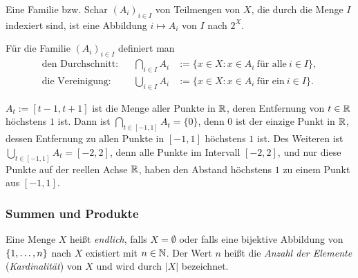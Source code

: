 Eine Familie bzw. Schar  $ (A_i)_{i \in I}$ von Teilmengen von $ X $, die durch die Menge $I$ indexiert sind,  ist eine Abbildung $i \mapsto A_i$ von $I$ nach $2^X$. 

Für die Familie $ (A_i)_{i \in I} $ definiert man
\begin{align*}
	\text{den Durchschnitt:} && \bigcap_{i \in I} A_i &:= \{ x \in X : x \in A_i \:\text{für alle}\: i \in I \},\\
	\text{die Vereinigung:} && \bigcup_{i \in I} A_i &:= \{ x \in X : x \in A_i \:\text{für ein}\: i \in I \}.
\end{align*}

\begin{bsp}
	 $A_t := [t-1,t+1]$ ist die Menge aller Punkte in $\mathbb R$, deren Entfernung von $t \in \mathbb R$ höchstens $1$ ist. Dann ist $\bigcap_{t \in [-1,1]} A_t = \{0\}$, denn $0$ ist der einzige Punkt in $\mathbb R$, dessen Entfernung zu allen Punkte in $[-1,1]$ höchstens $1$ ist. Des Weiteren ist $\bigcup_{t \in [-1,1]} A_t = [-2,2]$, denn alle Punkte im Intervall $[-2,2]$, und nur diese Punkte auf der reellen Achse $\mathbb R$, haben den Abstand höchstens $1$ zu einem Punkt aus $[-1,1]$. 
\end{bsp} 


\subsubsection{Summen und Produkte}

Eine Menge $ X $ heißt \emph{endlich}, falls $ X = \emptyset $ oder falls eine bijektive Abbildung von $ \{ 1,\ldots,n \} $ nach $ X $ existiert mit $ n \in \mathbb N $. Der Wert $ n $ heißt die \emph{Anzahl der Elemente} (\emph{Kardinalität}) von $ X $ und wird durch $ |X| $ bezeichnet.

